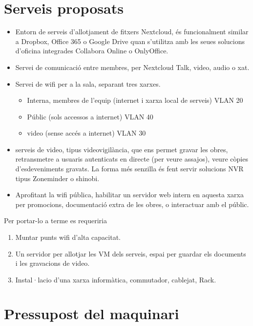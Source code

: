 \documentclass[
  10pt,
]{krantz}
\providecommand{\tightlist}{%
  \setlength{\itemsep}{0pt}\setlength{\parskip}{0pt}}
\begin{document}
\hypertarget{serveis-proposats}{%
\section{Serveis proposats}\label{serveis-proposats}}

\begin{itemize}
\tightlist
\item
  Entorn de serveis d'allotjament de fitxers Nextcloud, és funcionalment similar a Dropbox, Office 365 o Google Drive quan s'utilitza amb les seues solucions d'oficina integrades Collabora Online o OnlyOffice.
\item
  Servei de comunicació entre membres, per Nextcloud Talk, video, audio o xat.
\item
  Servei de wifi per a la sala, separant tres xarxes.

  \begin{itemize}
  \tightlist
  \item
    Interna, membres de l'equip (internet i xarxa local de serveis) VLAN 20
  \item
    Públic (sols accessos a internet) VLAN 40
  \item
    video (sense accés a internet) VLAN 30
  \end{itemize}
\item
  serveis de video, tipus videovigilància, que ens permet gravar les obres, retransmetre a usuaris autenticats en directe (per veure assajos), veure còpies d'esdeveniments gravats. La forma més senzilla és fent servir solucions NVR tipus Zoneminder o shinobi.
\item
  Aprofitant la wifi pública, habilitar un servidor web intern en aquesta xarxa per promocions, documentació extra de les obres, o interactuar amb el públic.
\end{itemize}

Per portar-lo a terme es requeriria

\begin{enumerate}
\def\labelenumi{\arabic{enumi}.}
\tightlist
\item
  Muntar punts wifi d'alta capacitat.
\item
  Un servidor per allotjar les VM dels serveis, espai per guardar els documents i les gravacions de video.
\item
  Instal·lacio d'una xarxa informàtica, commutador, cablejat, Rack.
\end{enumerate}

\hypertarget{pressupost-del-maquinari}{%
\section{Pressupost del maquinari}\label{pressupost-del-maquinari}}
\end{document}

